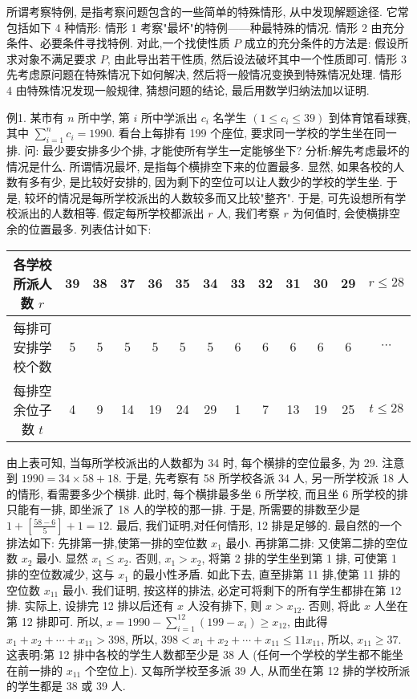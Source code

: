 
所谓考察特例, 是指考察问题包含的一些简单的特殊情形, 从中发现解题途径.
它常包括如下 4 种情形:
情形 1 考察"最坏"的特例——种最特殊的情况.
情形 2 由充分条件、必要条件寻找特例.
对此,一个找使性质 $P$ 成立的充分条件的方法是: 假设所求对象不满足要求 $P$, 由此导出若干性质, 然后设法破坏其中一个性质即可.
情形 3 先考虑原问题在特殊情况下如何解决, 然后将一般情况变换到特殊情况处理.
情形 4 由特殊情况发现一般规律, 猜想问题的结论, 最后用数学归纳法加以证明.



例1. 某市有 $n$ 所中学, 第 $i$ 所中学派出 $c_i$ 名学生 $\left(1 \leqslant c_i \leqslant 39\right)$ 到体育馆看球赛, 其中 $\sum_{i=1}^n c_i=1990$. 看台上每排有 199 个座位, 要求同一学校的学生坐在同一排.
问: 最少要安排多少个排, 才能使所有学生一定能够坐下? 
分析:解先考虑最坏的情况是什么.
所谓情况最坏, 是指每个横排空下来的位置最多.
显然, 如果各校的人数有多有少, 是比较好安排的, 因为剩下的空位可以让人数少的学校的学生坐.
于是, 较坏的情况是每所学校派出的人数较多而又比较"整齐". 于是, 可先设想所有学校派出的人数相等.
假定每所学校都派出 $r$ 人, 我们考察 $r$ 为何值时, 会使横排空余的位置最多.
列表估计如下:
\begin{tabular}{|c|c|c|c|c|c|c|c|c|c|c|c|c|}
\hline 各学校所派人数 $r$ & 39 & 38 & 37 & 36 & 35 & 34 & 33 & 32 & 31 & 30 & 29 & $r \leqslant 28$ \\
\hline 每排可安排学校个数 & 5 & 5 & 5 & 5 & 5 & 5 & 6 & 6 & 6 & 6 & 6 & $\cdots$ \\
\hline 每排空余位子数 $t$ & 4 & 9 & 14 & 19 & 24 & 29 & 1 & 7 & 13 & 19 & 25 & $t \leqslant 28$ \\
\hline
\end{tabular}
由上表可知, 当每所学校派出的人数都为 34 时, 每个横排的空位最多, 为 29.
注意到 $1990=34 \times 58+18$. 于是, 先考察有 58 所学校各派 34 人, 另一所学校派 18 人的情形, 看需要多少个横排.
此时, 每个横排最多坐 6 所学校, 而且坐 6 所学校的排只能有一排, 即坐派了 18 人的学校的那一排.
于是, 所需要的排数至少是 $1+\left[\frac{58-6}{5}\right]+1=12$.
最后, 我们证明,对任何情形, 12 排是足够的.
最自然的一个排法如下:
先排第一排,使第一排的空位数 $x_1$ 最小.
再排第二排: 又使第二排的空位数 $x_2$ 最小.
显然 $x_1 \leqslant x_2$. 否则, $x_1>x_2$, 将第 2 排的学生坐到第 1 排, 可使第 1 排的空位数减少, 这与 $x_1$ 的最小性矛盾.
如此下去, 直至排第 11 排,使第 11 排的空位数 $x_{11}$ 最小.
我们证明, 按这样的排法, 必定可将剩下的所有学生都排在第 12 排.
实际上, 设排完 12 排以后还有 $x$ 人没有排下, 则 $x>x_{12}$. 否则, 将此 $x$ 人坐在第 12 排即可.
所以, $x=1990-\sum_{i=1}^{12}\left(199-x_i\right) \geqslant x_{12}$, 由此得 $x_1+x_2+\cdots+ x_{11}>398$, 所以, $398<x_1+x_2+\cdots+x_{11} \leqslant 11 x_{11}$, 所以, $x_{11} \geqslant 37$. 这表明:第 12 排中各校的学生人数都至少是 38 人 (任何一个学校的学生都不能坐在前一排的 $x_{11}$ 个空位上). 又每所学校至多派 39 人, 从而坐在第 12 排的学校所派的学生都是 38 或 39 人.
